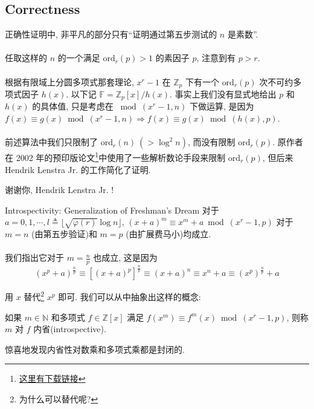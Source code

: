 \documentclass{beamer}
\def\ord{\textrm{ord}}
\begin{document}
\subsection{Correctness}
\begin{frame}
	正确性证明中, 非平凡的部分只有“证明通过第五步测试的 $n$ 是素数”. \\~\\

	任取这样的 $n$ 的一个满足 $\ord_r(p) > 1$ 的素因子 $p$, 注意到有 $p > r$.\\~\\

	根据有限域上分圆多项式那套理论, $x^r - 1$ 在 $\mathbb Z_p$ 下有一个 $\ord_r(p)$ 次不可约多项式因子 $h(x)$. 以下记 $\mathbb F = \mathbb Z_p[x] / h(x)$. 事实上我们没有显式地给出 $p$ 和 $h(x)$ 的具体值, 只是考虑在 $\bmod (x^r - 1, n)$ 下做运算, 是因为 $f(x) \equiv g(x) \bmod (x^r-1, n) \Rightarrow f(x) \equiv g(x) \bmod (h(x), p)$.\\~\\

	前述算法中我们只限制了 $\ord_r(n) \ (> \log^2n)$, 而没有限制 $\ord_r(p)$. 原作者在 2002 年的预印版论文\footnote{\tiny \href{https://www.cse.iitk.ac.in/users/manindra/algebra/primality_original.pdf}{\color{red}这里有下载链接}}中使用了一些解析数论手段来限制 $\ord_r(p)$, 但后来 Hendrik Lenstra Jr. 的工作简化了证明.

	\begin{center}
		{\kaishu 谢谢你, Hendrik Lenstra Jr. !}		
	\end{center}
\end{frame}
\begin{frame}{Introspectivity: Generalization of Freshman's Dream}
	对于 $a = 0, 1, \cdots, l \triangleq \lfloor \sqrt{\varphi(r)} \log n \rfloor$, $(x + a)^m \equiv x^m + a \bmod (x^r-1, p)$ 对于 $m = n$ (由第五步验证)和 $m = p$ (由扩展费马小)均成立.\\~\\
	
	我们指出它对于 $m = \frac np$ 也成立, 这是因为
	$$(x^p + a)^{\frac np} \equiv [(x + a)^p]^{\frac np} \equiv (x + a)^n \equiv x^n + a \equiv (x^p)^{\frac np} + a$$

	用 $x$ 替代\footnote{\tiny 为什么可以替代呢?} $x^p$ 即可. 我们可以从中抽象出这样的概念:

	\begin{definition}[内省]
		如果 $m \in \mathbb N$ 和多项式 $f \in \mathbb Z[x]$ 满足 $f(x^m) \equiv f^m(x) \bmod (x^r-1, p)$, 则称 $m$ 对 $f$ 内省(introspective).
	\end{definition}
	惊喜地发现内省性对数乘和多项式乘都是封闭的.
\end{frame}
\end{document}
